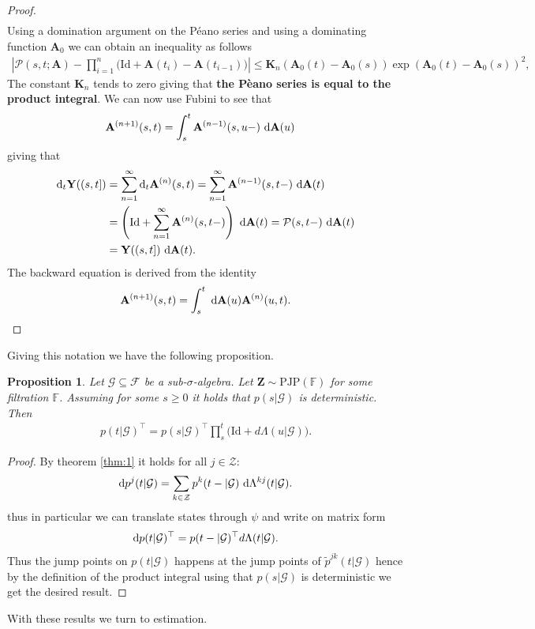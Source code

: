 \documentclass[12pt,letter,twoside]{article}
\theoremstyle{plain}
\newtheorem{proposition}[theorem]{Proposition}
\theoremstyle{definition}
\theoremstyle{remark}
\begin{document}
\begin{proof}
\begin{align}
\end{align}
Using a domination argument on the Péano series and using a dominating function $\mathbf A_0$ we can obtain an inequality as follows
\begin{align}
    \left\vert\mathcal P(s,t;\mathbf A)-\prod_{i=1}^n\Big(\text{Id}+\mathbf A(t_i)-\mathbf A(t_{i-1})\Big)\right\vert\le \mathbf K_n \left(\mathbf A_0(t)-\mathbf A_0(s)\right)\exp\left(\mathbf A_0(t)-\mathbf A_0(s)\right)^2,
\end{align}
The constant $\mathbf K_n$ tends to zero giving that \textbf{the Pèano series is equal to the product integral}. We can now use Fubini to see that
\begin{align}
\mathbf A^{(n+1)}(s,t)&=\int_s^t \mathbf A^{(n-1)}(s,u-)\ \text d\mathbf A(u)
\end{align}
giving that
\begin{align}
\text d_t\mathbf Y((s,t])&=\sum_{n=1}^\infty \text d_t \mathbf A^{(n)}(s,t)=\sum_{n=1}^\infty \mathbf A^{(n-1)}(s,t-)\ \text d\mathbf A(t)\\
&=\left(\text{Id} + \sum_{n=1}^\infty \mathbf A^{(n)}(s,t-)\right)\ \text d\mathbf A(t)=\mathcal P(s,t-)\ \text d\mathbf A(t)\\
&=\mathbf Y((s,t])\ \text d\mathbf A(t).
\end{align}
The backward equation is derived from the identity
\begin{align}
\mathbf A^{(n+1)}(s,t)=\int_s^t\ \text d\mathbf A(u)\mathbf A^{(n)}(u,t).
\end{align}
\end{proof}
Giving this notation we have the following proposition.
\begin{proposition}
Let $\mathcal G\subseteq\mathcal F$ be a sub-$\sigma$-algebra. Let $\mathbf Z\sim \text{PJP}(\mathbb F)$ for some filtration $\mathbb F$. Assuming for some $s\ge 0$ it holds that $p(s\vert\mathcal G)$ is deterministic. Then
\begin{align}
    p(t\vert\mathcal G)^\top=p(s\vert\mathcal G)^\top\prod_{s}^t\Big(\text{Id}+ d\Lambda(u\vert\mathcal G)\Big).
\end{align}
\end{proposition}
\begin{proof}
By theorem \ref{thm:1} it holds for all $j\in\mathcal Z$:
\begin{align}
\text d p^{j}(t\vert \mathcal G)=\sum_{k\in\mathcal Z} p^{k}(t-\vert\mathcal G)\ \text d\Lambda^{kj}(t\vert\mathcal G).
\end{align}
thus in particular we can translate states through $\psi$ and write on matrix form
\begin{align}
\text d p(t\vert\mathcal G)^\top=p(t-\vert\mathcal G)^\top d\Lambda(t\vert\mathcal G).
\end{align}
Thus the jump points on $p(t\vert\mathcal G)$ happens at the jump points of $\tilde p^{jk}(t\vert\mathcal G)$ hence by the definition of the product integral using that $p(s\vert\mathcal G)$ is deterministic we get the desired result.
\end{proof}
With these results we turn to estimation.
\end{document}
